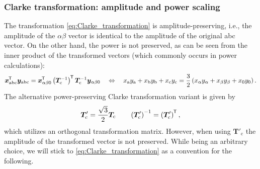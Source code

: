 \begin{frame}
	\frametitle{Clarke transformation: amplitude and power scaling}
    The transformation \eqref{eq:Clarke_transformation} is amplitude-preserving, i.e., the amplitude of the $\alpha\beta$ vector is identical to the amplitude of the original abc vector. On the other hand, the power is not preserved, as can be seen from the inner product of the transformed vectors (which commonly occurs in power calculations):
    \begin{equation*}
        \bm{x}_{\mathrm{abc}}^{\mkern-1.5mu\mathsf{T}} \bm{y}_{\mathrm{abc}} = \bm{x}_\mathrm{\alpha \beta 0}^{\mkern-1.5mu\mathsf{T}}\left(\bm{T}_\mathrm{c}^{-1}\right)^{\mkern-1.5mu\mathsf{T}} \bm{T}_\mathrm{c}^{-1}\bm{y}_\mathrm{\alpha \beta 0} \quad \Leftrightarrow \quad x_\mathrm{a}y_\mathrm{a} + x_\mathrm{b}y_\mathrm{b} + x_\mathrm{c}y_\mathrm{c} = \frac{3}{2}\left(x_\alpha y_\alpha + x_\beta y_\beta + x_0 y_0 \right).
    \end{equation*}
    The alternative power-preserving Clarke transformation variant is given by
    \begin{equation}
        \renewcommand{\arraystretch}{1.2}
        \bm{T}'_\mathrm{c} = \frac{\sqrt{3}}{2} \bm{T}_\mathrm{c} \qquad \left(\bm{T}'_\mathrm{c}\right)^{-1} = \left(\bm{T}'_\mathrm{c}\right)\T,
        \label{eq:Clarke_transformation_power_preserving}
    \end{equation}
    which utilizes an orthogonal transformation matrix. However, when using $\bm{T}'_\mathrm{c}$ the amplitude of the transformed vector is not preserved. While being an arbitrary choice, we will stick to \eqref{eq:Clarke_transformation} as a convention for the following. 
\end{frame}

